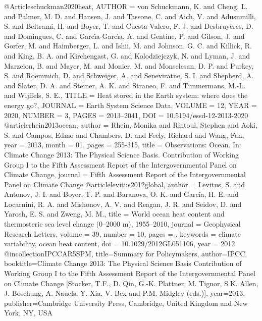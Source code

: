 @Article{schuckman2020heat,
 AUTHOR = {von Schuckmann, K. and Cheng, L. and Palmer, M. D. and Hansen, J. and Tassone, C. and Aich, V. and Adusumilli, S. and Beltrami, H. and Boyer, T. and Cuesta-Valero, F. J. and Desbruy\`eres, D. and Domingues, C. and Garc\'{\i}a-Garc\'{\i}a, A. and Gentine, P. and Gilson, J. and Gorfer, M. and Haimberger, L. and Ishii, M. and Johnson, G. C. and Killick, R. and King, B. A. and Kirchengast, G. and Kolodziejczyk, N. and Lyman, J. and Marzeion, B. and Mayer, M. and Monier, M. and Monselesan, D. P. and Purkey, S. and Roemmich, D. and Schweiger, A. and Seneviratne, S. I. and Shepherd, A. and Slater, D. A. and Steiner, A. K. and Straneo, F. and Timmermans, M.-L. and Wijffels, S. E.},
 TITLE = {{Heat stored in the Earth system: where does the energy go?}},
 JOURNAL = {Earth System Science Data},
 VOLUME = {12},
 YEAR = {2020},
 NUMBER = {3},
 PAGES = {2013--2041},
 DOI = {10.5194/essd-12-2013-2020}
}
@article{rhein2013ocean,
 author = {Rhein, Monika and Rintoul, Stephen and Aoki, S. and Campos, Edmo and Chambers, D. and Feely, Richard and Wang, Fan},
 year = {2013},
 month = {01},
 pages = {255-315},
 title = {{Observations: Ocean. In: Climate Change 2013: The Physical Science Basis. Contribution of Working Group I to the Fifth Assessment Report of the Intergovernmental Panel on Climate Change}},
 journal = {Fifth Assessment Report of the Intergovernmental Panel on Climate Change}
}
@article{levitus2012global,
 author = {Levitus, S. and Antonov, J. I. and Boyer, T. P. and Baranova, O. K. and Garcia, H. E. and Locarnini, R. A. and Mishonov, A. V. and Reagan, J. R. and Seidov, D. and Yarosh, E. S. and Zweng, M. M.},
 title = {{World ocean heat content and thermosteric sea level change (0–2000 m), 1955–2010}},
 journal = {Geophysical Research Letters},
 volume = {39},
 number = {10},
 pages = {},
 keywords = {climate variability, ocean heat content},
 doi = {10.1029/2012GL051106},
 year = {2012}
}
@incollection{IPCCAR5SPM,
 title={{Summary for Policymakers}},
 author={IPCC},
 booktitle={{Climate  Change  2013:  The  Physical  Science  Basis Contribution  of  Working  Group  I  to  the  Fifth  Assessment  Report  of  the  Intergovernmental  Panel  on  Climate  Change  [Stocker,  T.F.,  D.  Qin,  G.-K.  Plattner,  M.  Tignor,  S.K.  Allen,  J.  Boschung,  A.  Nauels,  Y.  Xia,  V.  Bex  and  P.M.  Midgley  (eds.)]}},
 year={2013},
 publisher={Cambridge University Press, Cambridge, United Kingdom and New York, NY, USA}
}
